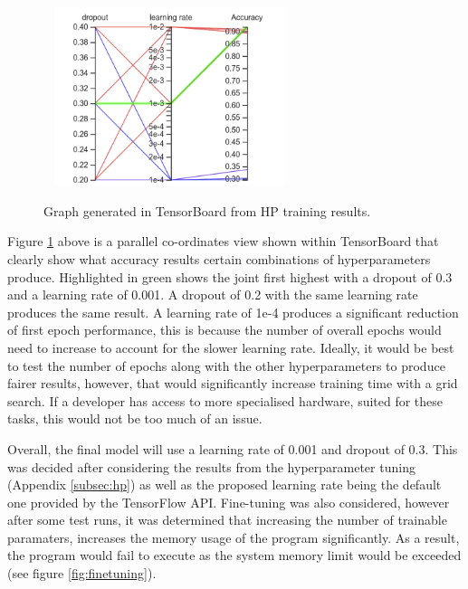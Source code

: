 \documentclass[12pt,a4paper]{report}
\begin{document}
\begin{figure}[h]\
    \centering
    \includegraphics[width=0.6\textwidth]{cross_graph.png}
    \caption{Graph generated in TensorBoard from HP training results.}
    \label{fig:cross}
\end{figure}

\break

Figure \ref{fig:cross} above is a parallel co-ordinates view shown within TensorBoard that clearly show what accuracy 
results 
certain combinations of hyperparameters produce. Highlighted in green shows the joint first highest with a dropout of 
0.3 and a learning rate of 0.001. A dropout of 0.2 with the same learning rate produces the same result. A learning rate
of 1e-4 produces a significant reduction of first epoch performance, this is because the number of overall epochs would
need to increase to account for the slower learning rate. Ideally, it would be best to test the number of epochs along 
with the other 
hyperparameters to produce fairer results, however, that would significantly increase training time with a grid search. 
If a developer has access to more specialised hardware, suited for these tasks, this would not be too much of
an issue.

\par

Overall, the final model will use a learning rate of 0.001 and dropout of 0.3. This was decided after considering the 
results from the hyperparameter tuning (Appendix \ref{subsec:hp}) as well as the proposed learning rate being the 
default one provided by the TensorFlow API. Fine-tuning was also considered, however after some test runs, it was
determined that increasing the number of trainable paramaters, increases the memory usage of the program significantly.
As a result, the program would fail to execute as the system memory limit would be exceeded 
(see figure \ref{fig:finetuning}).
\end{document}
